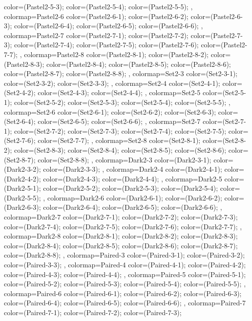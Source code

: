 {{color=(Pastel2-5-3);
color=(Pastel2-5-4);
color=(Pastel2-5-5);
},
colormap={Pastel2-6}{
color=(Pastel2-6-1);
color=(Pastel2-6-2);
color=(Pastel2-6-3);
color=(Pastel2-6-4);
color=(Pastel2-6-5);
color=(Pastel2-6-6);
},
colormap={Pastel2-7}{
color=(Pastel2-7-1);
color=(Pastel2-7-2);
color=(Pastel2-7-3);
color=(Pastel2-7-4);
color=(Pastel2-7-5);
color=(Pastel2-7-6);
color=(Pastel2-7-7);
},
colormap={Pastel2-8}{
color=(Pastel2-8-1);
color=(Pastel2-8-2);
color=(Pastel2-8-3);
color=(Pastel2-8-4);
color=(Pastel2-8-5);
color=(Pastel2-8-6);
color=(Pastel2-8-7);
color=(Pastel2-8-8);
},
colormap={Set2-3}{
color=(Set2-3-1);
color=(Set2-3-2);
color=(Set2-3-3);
},
colormap={Set2-4}{
color=(Set2-4-1);
color=(Set2-4-2);
color=(Set2-4-3);
color=(Set2-4-4);
},
colormap={Set2-5}{
color=(Set2-5-1);
color=(Set2-5-2);
color=(Set2-5-3);
color=(Set2-5-4);
color=(Set2-5-5);
},
colormap={Set2-6}{
color=(Set2-6-1);
color=(Set2-6-2);
color=(Set2-6-3);
color=(Set2-6-4);
color=(Set2-6-5);
color=(Set2-6-6);
},
colormap={Set2-7}{
color=(Set2-7-1);
color=(Set2-7-2);
color=(Set2-7-3);
color=(Set2-7-4);
color=(Set2-7-5);
color=(Set2-7-6);
color=(Set2-7-7);
},
colormap={Set2-8}{
color=(Set2-8-1);
color=(Set2-8-2);
color=(Set2-8-3);
color=(Set2-8-4);
color=(Set2-8-5);
color=(Set2-8-6);
color=(Set2-8-7);
color=(Set2-8-8);
},
colormap={Dark2-3}{
color=(Dark2-3-1);
color=(Dark2-3-2);
color=(Dark2-3-3);
},
colormap={Dark2-4}{
color=(Dark2-4-1);
color=(Dark2-4-2);
color=(Dark2-4-3);
color=(Dark2-4-4);
},
colormap={Dark2-5}{
color=(Dark2-5-1);
color=(Dark2-5-2);
color=(Dark2-5-3);
color=(Dark2-5-4);
color=(Dark2-5-5);
},
colormap={Dark2-6}{
color=(Dark2-6-1);
color=(Dark2-6-2);
color=(Dark2-6-3);
color=(Dark2-6-4);
color=(Dark2-6-5);
color=(Dark2-6-6);
},
colormap={Dark2-7}{
color=(Dark2-7-1);
color=(Dark2-7-2);
color=(Dark2-7-3);
color=(Dark2-7-4);
color=(Dark2-7-5);
color=(Dark2-7-6);
color=(Dark2-7-7);
},
colormap={Dark2-8}{
color=(Dark2-8-1);
color=(Dark2-8-2);
color=(Dark2-8-3);
color=(Dark2-8-4);
color=(Dark2-8-5);
color=(Dark2-8-6);
color=(Dark2-8-7);
color=(Dark2-8-8);
},
colormap={Paired-3}{
color=(Paired-3-1);
color=(Paired-3-2);
color=(Paired-3-3);
},
colormap={Paired-4}{
color=(Paired-4-1);
color=(Paired-4-2);
color=(Paired-4-3);
color=(Paired-4-4);
},
colormap={Paired-5}{
color=(Paired-5-1);
color=(Paired-5-2);
color=(Paired-5-3);
color=(Paired-5-4);
color=(Paired-5-5);
},
colormap={Paired-6}{
color=(Paired-6-1);
color=(Paired-6-2);
color=(Paired-6-3);
color=(Paired-6-4);
color=(Paired-6-5);
color=(Paired-6-6);
},
colormap={Paired-7}{
color=(Paired-7-1);
color=(Paired-7-2);
color=(Paired-7-3);
}}
